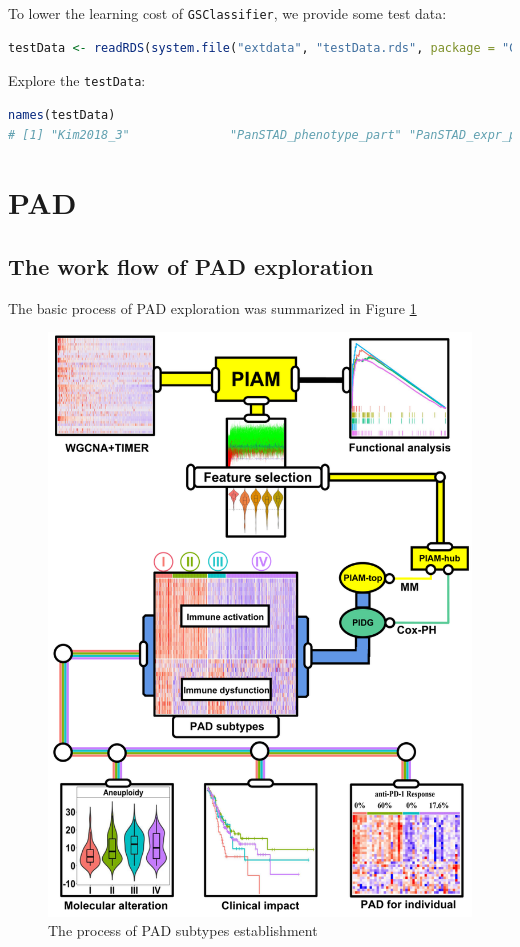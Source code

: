 \documentclass[
  12pt,
]{book}
\newcommand{\passthrough}[1]{#1}
\begin{document}
To lower the learning cost of \passthrough{\lstinline!GSClassifier!}, we provide some test data:

\begin{lstlisting}[language=R]
testData <- readRDS(system.file("extdata", "testData.rds", package = "GSClassifier"))
\end{lstlisting}

Explore the \passthrough{\lstinline!testData!}:

\begin{lstlisting}[language=R]
names(testData)
# [1] "Kim2018_3"              "PanSTAD_phenotype_part" "PanSTAD_expr_part"
\end{lstlisting}

\hypertarget{pad}{%
\section{PAD}\label{pad}}

\hypertarget{the-work-flow-of-pad-exploration}{%
\subsection{The work flow of PAD exploration}\label{the-work-flow-of-pad-exploration}}

The basic process of PAD exploration was summarized in Figure \ref{fig:flpad}

\begin{figure}

{\centering \includegraphics[width=0.9\linewidth]{./fig/Flowchart-PAD} 

}

\caption{The process of PAD subtypes establishment}\label{fig:flpad}
\end{figure}
\end{document}
